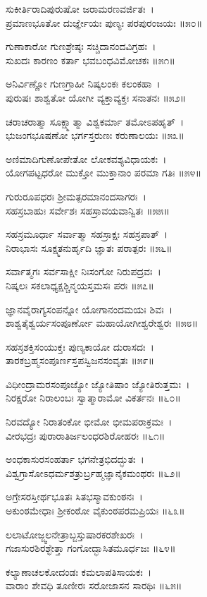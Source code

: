 ಸುಕೀರ್ತಿರಾದಿಪುರುಷೋ ಜರಾಮರಣವರ್ಜಿತಃ~।\\
ಪ್ರಮಾಣಭೂತೋ ದುರ್ಜ್ಞೇಯಃ ಪುಣ್ಯಃ ಪರಪುರಂಜಯಃ ॥೫೦॥

	ಗುಣಾಕಾರೋ ಗುಣಶ್ರೇಷ್ಠಃ ಸಚ್ಚಿದಾನಂದವಿಗ್ರಹಃ~।\\
	ಸುಖದಃ ಕಾರಣಂ ಕರ್ತಾ ಭವಬಂಧವಿಮೋಚಕಃ ॥೫೧॥

ಅನಿರ್ವಿಣ್ಣೋ ಗುಣಗ್ರಾಹೀ ನಿಷ್ಕಲಂಕಃ ಕಲಂಕಹಾ~।\\
ಪುರುಷಃ ಶಾಶ್ವತೋ ಯೋಗೀ ವ್ಯಕ್ತಾವ್ಯಕ್ತಃ ಸನಾತನಃ ॥೫೨॥

	ಚರಾಚರಾತ್ಮಾ ಸೂಕ್ಷ್ಮಾತ್ಮಾ ವಿಶ್ವಕರ್ಮಾ ತಮೋಽಪಹೃತ್~।\\
	ಭುಜಂಗಭೂಷಣೋ ಭರ್ಗಸ್ತರುಣಃ ಕರುಣಾಲಯಃ ॥೫೩॥

ಅಣಿಮಾದಿಗುಣೋಪೇತೋ ಲೋಕವಶ್ಯವಿಧಾಯಕಃ~।\\
ಯೋಗಪಟ್ಟಧರೋ ಮುಕ್ತೋ ಮುಕ್ತಾನಾಂ ಪರಮಾ ಗತಿಃ ॥೫೪॥

	ಗುರುರೂಪಧರಃ ಶ್ರೀಮತ್ಪರಮಾನಂದಸಾಗರಃ~।\\
	ಸಹಸ್ರಬಾಹುಃ ಸರ್ವೇಶಃ ಸಹಸ್ರಾವಯವಾನ್ವಿತಃ ॥೫೫॥

ಸಹಸ್ರಮೂರ್ಧಾ ಸರ್ವಾತ್ಮಾ ಸಹಸ್ರಾಕ್ಷಃ ಸಹಸ್ರಪಾತ್~।\\
ನಿರಾಭಾಸಃ ಸೂಕ್ಷ್ಮತನುರ್ಹೃದಿ ಜ್ಞಾತಃ ಪರಾತ್ಪರಃ ॥೫೬॥

	ಸರ್ವಾತ್ಮಗಃ ಸರ್ವಸಾಕ್ಷೀ ನಿಃಸಂಗೋ ನಿರುಪದ್ರವಃ~।\\
	ನಿಷ್ಕಲಃ ಸಕಲಾಧ್ಯಕ್ಷಶ್ಚಿನ್ಮಯಸ್ತಮಸಃ ಪರಃ ॥೫೭॥

ಜ್ಞಾನವೈರಾಗ್ಯಸಂಪನ್ನೋ ಯೋಗಾನಂದಮಯಃ ಶಿವಃ~।\\
ಶಾಶ್ವತೈಶ್ವರ್ಯಸಂಪೂರ್ಣೋ ಮಹಾಯೋಗೀಶ್ವರೇಶ್ವರಃ ॥೫೮॥

	ಸಹಸ್ರಶಕ್ತಿಸಂಯುಕ್ತಃ ಪುಣ್ಯಕಾಯೋ ದುರಾಸದಃ~।\\
	ತಾರಕಬ್ರಹ್ಮಸಂಪೂರ್ಣಸ್ತಪಸ್ವಿಜನಸಂವೃತಃ ॥೫೯॥

ವಿಧೀಂದ್ರಾಮರಸಂಪೂಜ್ಯೋ ಜ್ಯೋತಿಷಾಂ ಜ್ಯೋತಿರುತ್ತಮಃ~।\\
ನಿರಕ್ಷರೋ ನಿರಾಲಂಬಃ ಸ್ವಾತ್ಮಾರಾಮೋ ವಿಕರ್ತನಃ ॥೬೦॥

	ನಿರವದ್ಯೋ ನಿರಾತಂಕೋ ಭೀಮೋ ಭೀಮಪರಾಕ್ರಮಃ~।\\
	ವೀರಭದ್ರಃ ಪುರಾರಾತಿರ್ಜಲಂಧರಶಿರೋಹರಃ ॥೬೧॥

ಅಂಧಕಾಸುರಸಂಹರ್ತಾ ಭಗನೇತ್ರಭಿದದ್ಭುತಃ~।\\
ವಿಶ್ವಗ್ರಾಸೋಽಧರ್ಮಶತ್ರುರ್ಬ್ರಹ್ಮಜ್ಞಾನೈಕಮಂಥರಃ ॥೬೨॥

	ಅಗ್ರೇಸರಸ್ತೀರ್ಥಭೂತಃ ಸಿತಭಸ್ಮಾವಕುಂಠನಃ~।\\
	ಅಕುಂಠಮೇಧಾಃ ಶ್ರೀಕಂಠೋ ವೈಕುಂಠಪರಮಪ್ರಿಯಃ ॥೬೩॥

ಲಲಾಟೋಜ್ಜ್ವಲನೇತ್ರಾಬ್ಜಸ್ತುಷಾರಕರಶೇಖರಃ~।\\
ಗಜಾಸುರಶಿರಶ್ಛೇತ್ತಾ ಗಂಗೋದ್ಭಾಸಿತಮೂರ್ಧಜಃ ॥೬೪॥

	ಕಲ್ಯಾಣಾಚಲಕೋದಂಡಃ ಕಮಲಾಪತಿಸಾಯಕಃ~।\\
	ವಾರಾಂ ಶೇವಧಿ ತೂಣೀರಃ ಸರೋಜಾಸನ ಸಾರಥಿಃ ॥೬೫॥

